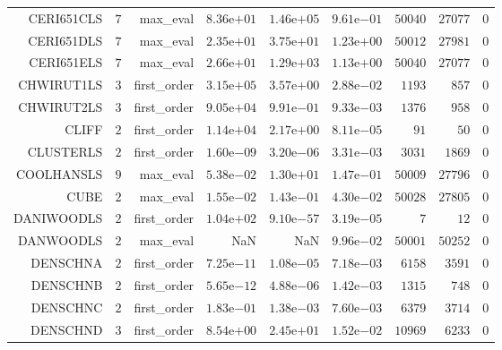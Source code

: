 \begin{longtable}{rrrrrrrrr}
CERI651CLS & \(     7\) & max\_eval & \( 8.36\)e\(+01\) & \( 1.46\)e\(+05\) & \( 9.61\)e\(-01\) & \( 50040\) & \( 27077\) & \(     0\) \\
CERI651DLS & \(     7\) & max\_eval & \( 2.35\)e\(+01\) & \( 3.75\)e\(+01\) & \( 1.23\)e\(+00\) & \( 50012\) & \( 27981\) & \(     0\) \\
CERI651ELS & \(     7\) & max\_eval & \( 2.66\)e\(+01\) & \( 1.29\)e\(+03\) & \( 1.13\)e\(+00\) & \( 50040\) & \( 27077\) & \(     0\) \\
CHWIRUT1LS & \(     3\) & first\_order & \( 3.15\)e\(+05\) & \( 3.57\)e\(+00\) & \( 2.88\)e\(-02\) & \(  1193\) & \(   857\) & \(     0\) \\
CHWIRUT2LS & \(     3\) & first\_order & \( 9.05\)e\(+04\) & \( 9.91\)e\(-01\) & \( 9.33\)e\(-03\) & \(  1376\) & \(   958\) & \(     0\) \\
CLIFF & \(     2\) & first\_order & \( 1.14\)e\(+04\) & \( 2.17\)e\(+00\) & \( 8.11\)e\(-05\) & \(    91\) & \(    50\) & \(     0\) \\
CLUSTERLS & \(     2\) & first\_order & \( 1.60\)e\(-09\) & \( 3.20\)e\(-06\) & \( 3.31\)e\(-03\) & \(  3031\) & \(  1869\) & \(     0\) \\
COOLHANSLS & \(     9\) & max\_eval & \( 5.38\)e\(-02\) & \( 1.30\)e\(+01\) & \( 1.47\)e\(-01\) & \( 50009\) & \( 27796\) & \(     0\) \\
CUBE & \(     2\) & max\_eval & \( 1.55\)e\(-02\) & \( 1.43\)e\(-01\) & \( 4.30\)e\(-02\) & \( 50028\) & \( 27805\) & \(     0\) \\
DANIWOODLS & \(     2\) & first\_order & \( 1.04\)e\(+02\) & \( 9.10\)e\(-57\) & \( 3.19\)e\(-05\) & \(     7\) & \(    12\) & \(     0\) \\
DANWOODLS & \(     2\) & max\_eval &       NaN &       NaN & \( 9.96\)e\(-02\) & \( 50001\) & \( 50252\) & \(     0\) \\
DENSCHNA & \(     2\) & first\_order & \( 7.25\)e\(-11\) & \( 1.08\)e\(-05\) & \( 7.18\)e\(-03\) & \(  6158\) & \(  3591\) & \(     0\) \\
DENSCHNB & \(     2\) & first\_order & \( 5.65\)e\(-12\) & \( 4.88\)e\(-06\) & \( 1.42\)e\(-03\) & \(  1315\) & \(   748\) & \(     0\) \\
DENSCHNC & \(     2\) & first\_order & \( 1.83\)e\(-01\) & \( 1.38\)e\(-03\) & \( 7.60\)e\(-03\) & \(  6379\) & \(  3714\) & \(     0\) \\
DENSCHND & \(     3\) & first\_order & \( 8.54\)e\(+00\) & \( 2.45\)e\(+01\) & \( 1.52\)e\(-02\) & \( 10969\) & \(  6233\) & \(     0\) \\

\end{longtable}
